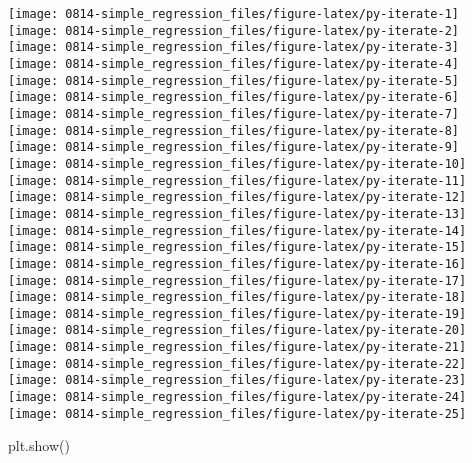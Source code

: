 \documentclass[]{book}
\newenvironment{Shaded}{\begin{snugshade}}{\end{snugshade}}
\newcommand{\NormalTok}[1]{#1}
\begin{document}
\texttt{[image: 0814-simple\_regression\_files/figure-latex/py-iterate-1]} \texttt{[image: 0814-simple\_regression\_files/figure-latex/py-iterate-2]} \texttt{[image: 0814-simple\_regression\_files/figure-latex/py-iterate-3]} \texttt{[image: 0814-simple\_regression\_files/figure-latex/py-iterate-4]} \texttt{[image: 0814-simple\_regression\_files/figure-latex/py-iterate-5]} \texttt{[image: 0814-simple\_regression\_files/figure-latex/py-iterate-6]} \texttt{[image: 0814-simple\_regression\_files/figure-latex/py-iterate-7]} \texttt{[image: 0814-simple\_regression\_files/figure-latex/py-iterate-8]} \texttt{[image: 0814-simple\_regression\_files/figure-latex/py-iterate-9]} \texttt{[image: 0814-simple\_regression\_files/figure-latex/py-iterate-10]} \texttt{[image: 0814-simple\_regression\_files/figure-latex/py-iterate-11]} \texttt{[image: 0814-simple\_regression\_files/figure-latex/py-iterate-12]} \texttt{[image: 0814-simple\_regression\_files/figure-latex/py-iterate-13]} \texttt{[image: 0814-simple\_regression\_files/figure-latex/py-iterate-14]} \texttt{[image: 0814-simple\_regression\_files/figure-latex/py-iterate-15]} \texttt{[image: 0814-simple\_regression\_files/figure-latex/py-iterate-16]} \texttt{[image: 0814-simple\_regression\_files/figure-latex/py-iterate-17]} \texttt{[image: 0814-simple\_regression\_files/figure-latex/py-iterate-18]} \texttt{[image: 0814-simple\_regression\_files/figure-latex/py-iterate-19]} \texttt{[image: 0814-simple\_regression\_files/figure-latex/py-iterate-20]} \texttt{[image: 0814-simple\_regression\_files/figure-latex/py-iterate-21]} \texttt{[image: 0814-simple\_regression\_files/figure-latex/py-iterate-22]} \texttt{[image: 0814-simple\_regression\_files/figure-latex/py-iterate-23]} \texttt{[image: 0814-simple\_regression\_files/figure-latex/py-iterate-24]} \texttt{[image: 0814-simple\_regression\_files/figure-latex/py-iterate-25]}

\begin{Shaded}
\begin{Highlighting}[]
\NormalTok{plt.show()}
\end{Highlighting}
\end{Shaded}
\end{document}
